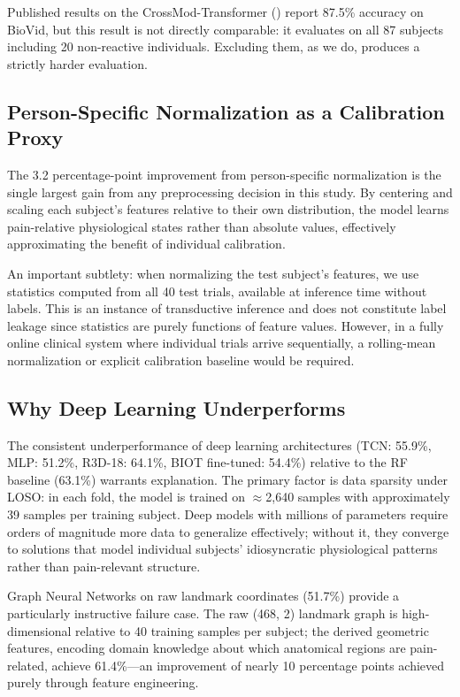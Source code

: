 \documentclass[10pt, twocolumn]{article}
\begin{document}
Published results on the CrossMod-Transformer (\cite{Farmani2025}) report 87.5\% accuracy on
BioVid, but this result is not directly comparable: it evaluates on all 87 subjects
including 20 non-reactive individuals. Excluding them, as we do, produces a strictly
harder evaluation.

\subsection{Person-Specific Normalization as a Calibration Proxy}

The 3.2 percentage-point improvement from person-specific normalization is the single
largest gain from any preprocessing decision in this study. By centering and scaling each
subject's features relative to their own distribution, the model learns pain-relative
physiological states rather than absolute values, effectively approximating the benefit
of individual calibration.

An important subtlety: when normalizing the test subject's features, we use statistics
computed from all 40 test trials, available at inference time without labels. This is an
instance of transductive inference and does not constitute label leakage since statistics
are purely functions of feature values. However, in a fully online clinical system where
individual trials arrive sequentially, a rolling-mean normalization or explicit calibration
baseline would be required.

\subsection{Why Deep Learning Underperforms}

The consistent underperformance of deep learning architectures (TCN: 55.9\%, MLP: 51.2\%,
R3D-18: 64.1\%, BIOT fine-tuned: 54.4\%) relative to the RF baseline (63.1\%) warrants
explanation. The primary factor is data sparsity under LOSO: in each fold, the model is
trained on $\approx$2,640 samples with approximately 39 samples per training subject. Deep
models with millions of parameters require orders of magnitude more data to generalize
effectively; without it, they converge to solutions that model individual subjects'
idiosyncratic physiological patterns rather than pain-relevant structure.

Graph Neural Networks on raw landmark coordinates (51.7\%) provide a particularly
instructive failure case. The raw (468, 2) landmark graph is high-dimensional relative to
40 training samples per subject; the derived geometric features, encoding domain knowledge
about which anatomical regions are pain-related, achieve 61.4\%---an improvement of nearly
10 percentage points achieved purely through feature engineering.
\end{document}
